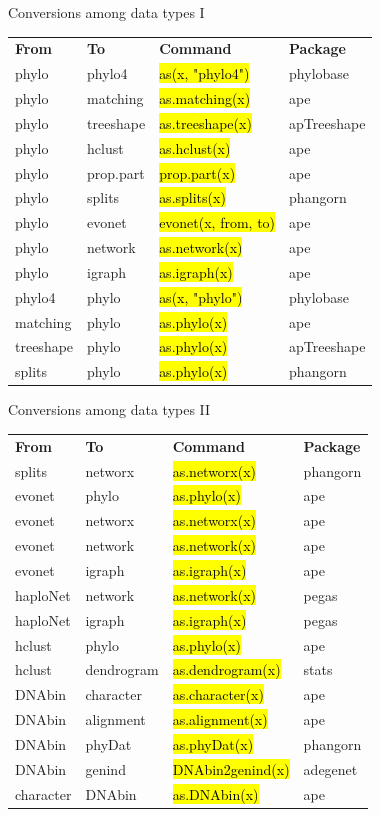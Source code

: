 \documentclass[compress, ucs, xelatex, 11pt, xcolor=svgnames,
  hyperref={
    bookmarks=true,
    unicode=true,
    colorlinks=true,
    pdftitle={Molecular data in R},
    plainpages=false,
    pdfauthor={Vojtech Zeisek},
    pdfsubject={Course about phylogeny and evolution in R},
    pdfcreator={XeLaTeX},
    pdfkeywords={R, evolution, phylogeny, molecular data},
    linkcolor=Tomato,
    anchorcolor=SaddleBrown,
    citecolor=Goldenrod,
    filecolor=DarkMagenta,
    menucolor=Sienna,
    urlcolor=DarkTurquoise,
    pdftex},
  url={hyphens, lowtilde} %
  ]{beamer}
\renewcommand{\texttt}[1]{\hl{\ttfamily #1}}
\begin{document}
\begin{frame}{Conversions among data types I} %
  \begin{tabular}{llll}
    \textbf{From} & \textbf{To} & \textbf{Command} & \textbf{Package}\\
    phylo & phylo4 & \texttt{as(x, "phylo4")} & phylobase\\
    phylo & matching & \texttt{as.matching(x)} & ape\\
    phylo & treeshape & \texttt{as.treeshape(x)} & apTreeshape\\
    phylo & hclust & \texttt{as.hclust(x)} & ape\\
    phylo & prop.part & \texttt{prop.part(x)} & ape\\
    phylo & splits & \texttt{as.splits(x)} & phangorn\\
    phylo & evonet & \texttt{evonet(x, from, to)} & ape\\
    phylo & network & \texttt{as.network(x)} & ape\\
    phylo & igraph & \texttt{as.igraph(x)} & ape\\
    phylo4 & phylo & \texttt{as(x, "phylo")} & phylobase\\
    matching & phylo & \texttt{as.phylo(x)} & ape\\
    treeshape & phylo & \texttt{as.phylo(x)} & apTreeshape\\
    splits & phylo & \texttt{as.phylo(x)} & phangorn
  \end{tabular}
\end{frame}

\begin{frame}{Conversions among data types II}
  \begin{tabular}{llll}
    \textbf{From} & \textbf{To} & \textbf{Command} & \textbf{Package}\\
    splits & networx & \texttt{as.networx(x)} & phangorn\\
    evonet & phylo & \texttt{as.phylo(x)} & ape\\
    evonet & networx & \texttt{as.networx(x)} & ape\\
    evonet & network & \texttt{as.network(x)} & ape\\
    evonet & igraph & \texttt{as.igraph(x)} & ape\\
    haploNet & network & \texttt{as.network(x)} & pegas\\
    haploNet & igraph & \texttt{as.igraph(x)} & pegas\\
    hclust & phylo & \texttt{as.phylo(x)} & ape\\
    hclust & dendrogram & \texttt{as.dendrogram(x)} & stats\\
    DNAbin & character & \texttt{as.character(x)} & ape\\
    DNAbin & alignment & \texttt{as.alignment(x)} & ape\\
    DNAbin & phyDat & \texttt{as.phyDat(x)} & phangorn\\
    DNAbin & genind & \texttt{DNAbin2genind(x)} & adegenet\\
    character & DNAbin & \texttt{as.DNAbin(x)} & ape
  \end{tabular}
\end{frame}
\end{document}
